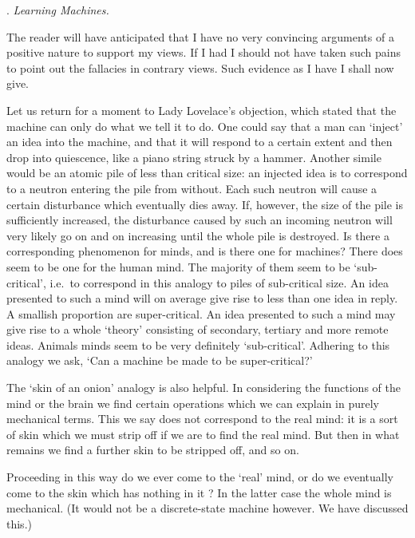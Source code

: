 \documentclass[10pt]{article} %
\begin{document}
\vspace{0.5\baselineskip} %
\noindent{}. \textit{Learning Machines.}
\vspace{0.5\baselineskip} %

The reader will have anticipated that I have no very convincing arguments of a positive nature to support my views. If I had I should not have taken such pains to point out the fallacies in contrary views. Such evidence as I have I shall now give.

Let us return for a moment to Lady Lovelace's objection, which stated that the machine can only do what we tell it to do. One could say that a man can `inject' an idea into the machine, and that it will respond to a certain extent and then drop into quiescence, like a piano string struck by a hammer. Another simile would be an atomic pile of less than critical size: an injected idea is to correspond to a neutron entering the pile from without. Each such neutron will cause a certain disturbance which eventually dies away. If, however, the size of the pile is sufficiently increased, the disturbance caused by such an incoming neutron will very likely go on and on increasing until the whole pile is destroyed. Is there a corresponding phenomenon for minds, and is there one for machines? There does seem to be one for the human mind. The majority of them seem to be `sub-critical', i.e.~to correspond in this analogy to piles of sub-critical size. An idea presented to such a mind will on average give rise to less than one idea in reply. A smallish proportion are super-critical. An idea presented to such a mind may give rise to a whole `theory' consisting of secondary, tertiary and more remote ideas. Animals minds seem to be very definitely `sub-critical'. Adhering to this analogy we ask, `Can a machine be made to be super-critical?'

The `skin of an onion' analogy is also helpful. In considering the functions of the mind or the brain we find certain operations which we can explain in purely mechanical terms. This we say does not correspond to the real mind: it is a sort of skin which we must strip off if we are to find the real mind. But then in what remains we find a further skin to be stripped off, and so on.

Proceeding in this way do we ever come to the `real' mind, or do we eventually come to the skin which has nothing in it ? In the latter case the whole mind is mechanical. (It would not be a discrete-state machine however. We have discussed this.)
\end{document}
